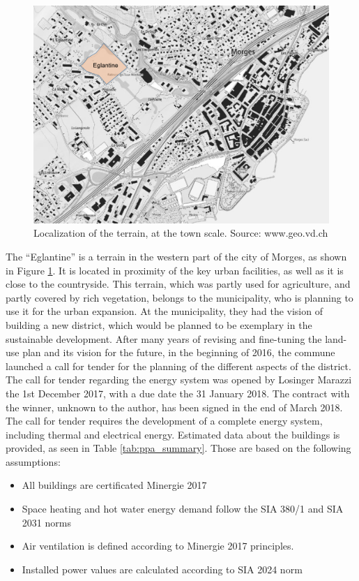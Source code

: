 \documentclass{article}
\begin{document}
\begin{figure}[h!]
\centering
\includegraphics[width=1\textwidth]{morges.png}
\caption{Localization of the terrain, at the town scale. Source: www.geo.vd.ch}
\label{fig:morges}
\end{figure}

The “Eglantine” is a terrain in the western part of the city of Morges, as shown in Figure \ref{fig:morges}. It is located in proximity of the key urban facilities, as well as it is close to the countryside. This terrain, which was partly used for agriculture, and partly covered by rich vegetation, belongs to the municipality, who is planning to use it for the urban expansion. At the municipality, they had the vision of building a new district, which would be planned to be exemplary in the sustainable development. After many years of revising and fine-tuning the land-use plan and its vision for the future, in the beginning of 2016, the commune launched a call for tender for the planning of the different aspects of the district. The call for tender regarding the energy system was opened by Losinger Marazzi the 1st December 2017, with a due date the 31 January 2018. The contract with the winner, unknown to the author, has been signed in the end of March 2018. \\

The call for tender requires the development of a complete energy system, including thermal and electrical energy. Estimated data about the buildings is provided, as seen in Table \ref{tab:ppa_summary}. Those are based on the following assumptions:
\begin{itemize}
    \item All buildings are certificated Minergie 2017
    \item Space heating and hot water energy demand follow the SIA 380/1 and SIA 2031 norms
    \item Air ventilation is defined according to Minergie 2017 principles.
    \item Installed power values are calculated according to SIA 2024 norm
\end{itemize}
\end{document}

